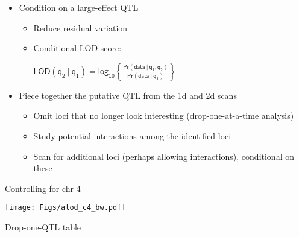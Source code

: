 \documentclass[12pt]{article}
\newcommand{\headsize}{\fontsize{35}{35} \selectfont}
\newcommand{\smallersize}{\fontsize{20}{25} \selectfont}
\newcommand{\smallestsize}{\fontsize{18}{22} \selectfont}
\newcommand{\lod}{\text{LOD}}
\begin{document}
\hfill
\begin{minipage}{10in}
\begin{itemize}
\itemsep36pt
\item Condition on a large-effect QTL


{\color{myblue} \smallestsize
\begin{itemize}
\item Reduce residual variation
\item Conditional LOD score:

\vspace{1cm}

\hspace{1in} $ \displaystyle{\mathsf{\lod(q_2 \ | \ q_1) = \text{log}_{10}
    \left\{\frac{\text{Pr}(\text{data} \ | \ q_1, q_2)}{
    \text{Pr}(\text{data} \ | \ q_1)}\right\} }}$
\end{itemize} }

\item Piece together the putative QTL from the 1d and 2d scans

{\color{myblue} \smallestsize
\begin{itemize}
\item Omit loci that no longer look interesting (drop-one-at-a-time analysis)
\item Study potential interactions among the identified loci
\item Scan for additional loci (perhaps allowing interactions), conditional on these
\end{itemize} }

\end{itemize}
\end{minipage}


\newpage

\headsize \color{myyellow}
\hfill \begin{minipage}{5.75in}
\centering
Controlling for chr 4
\end{minipage}

\vfill

\centerline{\texttt{[image: Figs/alod\_c4\_bw.pdf]}}



\newpage

\headsize \color{myyellow}
\hfill \begin{minipage}{5.75in}
\centering
Drop-one-QTL table
\end{minipage}


\vspace{40mm}

\color{mywhite} \smallersize
\end{document}
